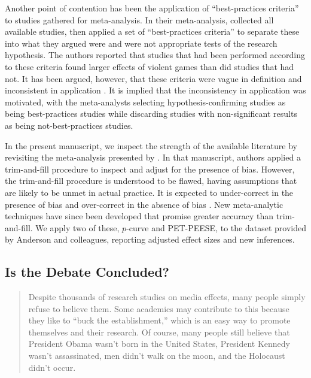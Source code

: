 \documentclass[man]{apa6}
\begin{document}
Another point of contention has been the application of ``best-practices criteria'' to studies gathered for meta-analysis. In their meta-analysis, \citet{Anderson:etal:2010} collected all available studies, then applied a set of ``best-practices criteria'' to separate these into what they argued were and were not appropriate tests of the research hypothesis. The authors reported that studies that had been performed according to these criteria found larger effects of violent games than did studies that had not. It has been argued, however, that these criteria were vague in definition and inconsistent in application \citep{Elson:Ferguson:2014,Ferguson:Kilburn:2010}. 
It is implied that the inconsistency in application was motivated, with the meta-analysts selecting hypothesis-confirming studies as being best-practices studies while discarding studies with non-significant results as being not-best-practices studies.

In the present manuscript, we inspect the strength of the available literature by revisiting the meta-analysis presented by \citet{Anderson:etal:2010}. In that manuscript, authors applied a trim-and-fill procedure \citep{Duval:Tweedie:2000} to inspect and adjust for the presence of bias. 
However, the trim-and-fill procedure is understood to be flawed, having assumptions that are likely to be unmet in actual practice. It is expected to under-correct in the presence of bias and over-correct in the absence of bias \citep{Peters:etal:2007,Simonsohn:DATACOLADAPOST}.
New meta-analytic techniques have since been developed that promise greater accuracy than trim-and-fill. We apply two of these, $p$-curve and PET-PEESE, to the dataset provided by Anderson and colleagues, reporting adjusted effect sizes and new inferences.

\subsection{Is the Debate Concluded?}
\begin{quote}
Despite thousands of research studies on media effects, many people simply refuse to believe them. Some academics may contribute to this because they like to ``buck the establishment,'' which is an easy way to promote themselves and their research. Of course, many people still believe that President Obama wasn't born in the United States, President Kennedy wasn't assassinated, men didn't walk on the moon, and the Holocaust didn't occur. \citep[p. 572]{Strasburger:etal:2014}
\end{quote}
\end{document}
